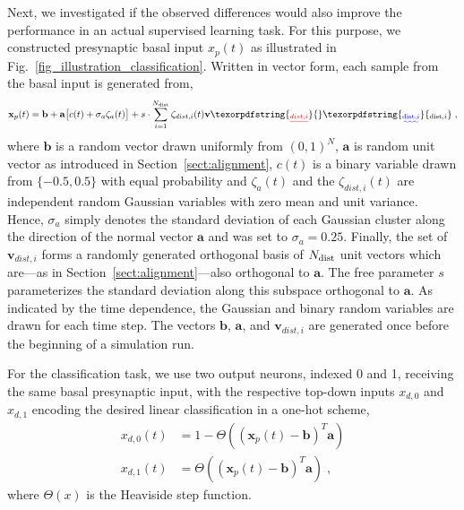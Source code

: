 \documentclass[utf8]{frontiersSCNS} %
\providecommand{\DIFaddtex}[1]{{\protect\color{blue}\uwave{#1}}} %
\providecommand{\DIFdeltex}[1]{{\protect\color{red}\sout{#1}}}                      %
\providecommand{\DIFaddbegin}{} %
\providecommand{\DIFaddend}{} %
\providecommand{\DIFdelbegin}{} %
\providecommand{\DIFdelend}{} %
\providecommand{\DIFadd}[1]{\texorpdfstring{\DIFaddtex{#1}}{#1}} %
\providecommand{\DIFdel}[1]{\texorpdfstring{\DIFdeltex{#1}}{}} %
\begin{document}
Next, we investigated if the observed differences would also improve
the performance in an actual supervised learning task.
For this purpose, we constructed presynaptic basal 
input $x_p(t)$ as illustrated in 
Fig.~\ref{fig_illustration_classification}.
Written in vector form, each sample from the basal 
input is generated from,
\begin{equation}
\mathbf{x}_p(t) = \mathbf{b} + 
\mathbf{a}\big[c(t) + \sigma_a \zeta_a(t) \big] 
+ s \cdot \sum_{i=1}^{N_{\rm dist}} 
\zeta_{dist,i}(t) \mathbf{v}\DIFdelbegin \DIFdel{_{dist,i} }\DIFdelend \DIFaddbegin \DIFadd{_{{\rm dist},i} }\DIFaddend \; ,
\end{equation}
where $\mathbf{b}$ is a random vector drawn uniformly from
$(0,1)^N$, $\mathbf{a}$ is random unit vector as introduced in 
Section~\ref{sect:alignment}, $c(t)$ is a binary variable drawn 
from $\{-0.5,0.5\}$ with equal probability and $\zeta_a(t)$ and the
$\zeta_{dist,i}(t)$ are independent random Gaussian variables with 
zero mean and unit variance. 
Hence, $\sigma_a$ simply denotes the standard deviation of each Gaussian
cluster along the direction of the normal vector $\mathbf{a}$ and was
set to $\sigma_a = 0.25$. 
Finally, the set of \DIFdelbegin \DIFdel{$\mathbf{v}_{dist,i}$ }\DIFdelend \DIFaddbegin \DIFadd{$\mathbf{v}_{{\rm dist},i}$ }\DIFaddend forms a 
randomly generated orthogonal basis of $N_{\rm dist}$ 
unit vectors which are---as in 
Section~\ref{sect:alignment}---also orthogonal to 
$\mathbf{a}$. The free parameter $s$ parameterizes
the standard deviation along this subspace orthogonal 
to $\mathbf{a}$. As indicated by the time dependence, 
the Gaussian and binary random variables are drawn 
for each time step. The vectors $\mathbf{b}$, 
$\mathbf{a}$, and \DIFdelbegin \DIFdel{$\mathbf{v}_{dist,i}$ }\DIFdelend \DIFaddbegin \DIFadd{$\mathbf{v}_{{\rm dist},i}$ }\DIFaddend are generated
once before the beginning of a simulation run.

For the classification task, we use two output 
neurons, indexed 0 and 1,  receiving the same 
basal presynaptic input, with the respective 
top-down inputs $x_{d,0}$ and $x_{d,1}$ encoding 
the desired linear classification in a one-hot 
scheme, 
\begin{align}
x_{d,0}(t) &= 1 - \Theta\left( \left(\mathbf{x}_p(t) - 
\mathbf{b}\right)^T \mathbf{a}\right) \\
x_{d,1}(t) &= \Theta\left( \left(\mathbf{x}_p(t) - 
\mathbf{b}\right)^T \mathbf{a}\right) \; ,
\end{align}
where $\Theta(x)$ is the Heaviside step function.
\end{document}
